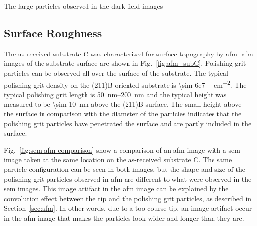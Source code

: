 The large particles observed in the dark field images 

\subsection{Surface Roughness}
The as-received substrate C was characterised for surface topography by \ac{afm}. \Ac{afm} images of the substrate surface are shown in Fig.~\ref{fig:afm_subC}. Polishing grit particles can be observed all over the surface of the substrate. The typical polishing grit density on the (211)B-oriented substrate is \SI{\sim 6e7 }{\particle\centi\metre^{-2}}. The typical polishing grit length is \SIrange{50}{200}{\nano\metre} and the typical height was measured to be \SI{\sim 10}{\nano\metre} above the (211)B surface. The small height above the surface in comparison with the diameter of the particles indicates that the polishing grit particles have penetrated the surface and are partly included in the surface.

Fig.~\ref{fig:sem-afm-comparison} show a comparison of an \ac{afm} image with a \ac{sem} image taken at the same location on the as-received substrate C. The same particle configuration can be seen in both images, but the shape and size of the polishing grit particles observed in \ac{afm} are different to what were observed in the \ac{sem} images. This image artifact in the \ac{afm} image can be explained by the convolution effect between the tip and the polishing grit particles, as described in Section~\ref{sec:afm}. In other words, due to a too-course tip, an image artifact occur in the \ac{afm} image that makes the particles look wider and longer than they are. 

